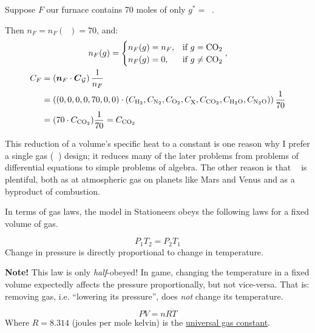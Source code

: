 \documentclass{article}
\DeclareMathOperator{\Hyd}{\mathrm{H}_2}
\DeclareMathOperator{\Nit}{\mathrm{N}_2}
\DeclareMathOperator{\Ox}{\mathrm{O}_2}
\DeclareMathOperator{\Pol}{\mathrm{X}}
\DeclareMathOperator{\CDiox}{\mathrm{CO}_2}
\DeclareMathOperator{\Water}{\mathrm{H}_2\mathrm{O}}
\DeclareMathOperator{\NiOx}{\mathrm{N}_2\mathrm{O}}
\begin{document}
\begin{example}
    Suppose $F$ our furnace contains 70 moles of only $g^*=\CDiox$.

    Then $n_F=n_F(\CDiox)=70$, and:
    \begin{gather*}
        n_F(g) = \begin{cases}
            n_F(g) = n_F, & \text{if } g = \CDiox \\
            n_F(g) = 0, & \text{if } g \ne \CDiox \\
        \end{cases}, \\
        \begin{aligned}
            C_F
            &= \left(\vec{n}_F \cdot \vec{C}_{\calG}\right)\frac{1}{n_F} \\
            &=
            \left((0,0,0,0,70,0,0)
            \cdot
            (C_{\Hyd},C_{\Nit},C_{\Ox},C_{\Pol},C_{\CDiox},C_{\Water},C_{\NiOx})\right)
            \frac{1}{70}
            \\
            &= (70\cdot C_{\CDiox})\frac{1}{70} = C_{\CDiox}
        \end{aligned}
    \end{gather*}
\end{example}
This reduction of a volume's specific heat to a constant is one reason why I prefer a single gas
($\CDiox$) design; it reduces many of the later problems from problems of differential equations to
simple problems of algebra. The other reason is that $\CDiox$ is plentiful, both as at atmospheric
gas on planets like Mars and Venus and as a byproduct of combustion.

In terms of gas laws, the model in Stationeers obeys the following laws for a fixed volume of gas.

\begin{definition}
    \begin{equation}
        P_1 T_2=P_2 T_1
        \label{eq:gay-lussac}
    \end{equation}
    Change in pressure is directly proportional to change in temperature.
\end{definition}
\textbf{Note!} This law is only \emph{half}-obeyed! In game, changing the temperature in a
fixed volume expectedly affects the pressure proportionally, but not vice-versa. That is:
removing gas, i.e. ``lowering its pressure'', does \emph{not} change its temperature.

\begin{definition}
    \begin{equation}
        PV=nRT
        \label{eq:ideal}
    \end{equation}
    Where $R=8.314$ (joules per mole kelvin)
    is the \href{https://en.wikipedia.org/wiki/Gas_constant}{universal gas constant}.
\end{definition}
\end{document}
